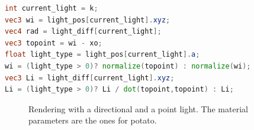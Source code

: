 \begin{lstlisting}[language=GLSL,label=lst:multilighttype,caption={GLSL Code to calculate the radiance \gl{Li} and the incoming light direction \gl{wi} for the k-th directional or point light source.}]
int current_light = k;
vec3 wi = light_pos[current_light].xyz;
vec4 rad = light_diff[current_light];
vec3 topoint = wi - xo;
float light_type = light_pos[current_light].a;
wi = (light_type > 0)? normalize(topoint) : normalize(wi);
vec3 Li = light_diff[current_light].xyz;
Li = (light_type > 0)? Li / dot(topoint,topoint) : Li;
\end{lstlisting}

\begin{figure}
\centering
{}
\caption{Rendering with a directional and a point light. The material parameters are the ones for potato.}
\label{fig:dir_point_comparison}
\end{figure}


